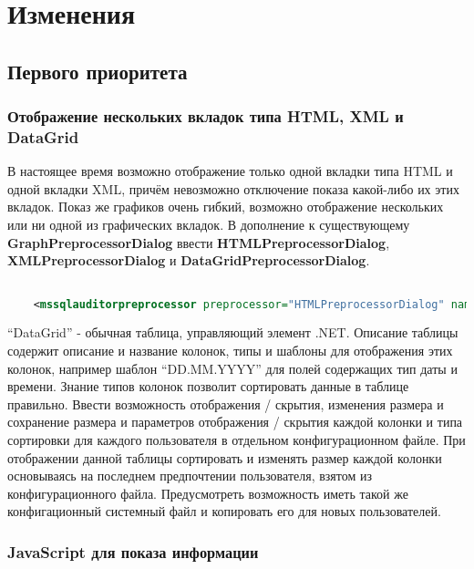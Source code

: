 \section{Изменения}

\subsection{Первого приоритета}

\subsubsection{Отображение нескольких вкладок типа HTML, XML и DataGrid}

В настоящее время возможно отображение только одной вкладки типа HTML и одной вкладки XML, причём
невозможно отключение показа какой-либо их этих вкладок. Показ же графиков очень гибкий, возможно
отображение нескольких или ни одной из графических вкладок. В дополнение к существующему
\textbf{Graph\-Preprocessor\-Dialog} ввести \textbf{HTML\-Preprocessor\-Dialog},
\textbf{XML\-Preprocessor\-Dialog} и \textbf{DataGrid\-Preprocessor\-Dialog}.

\begin{lstlisting}[language=XML,label=MSSQLServerAuditor.xml,caption=MSSQLServerAuditor.xml]

	<mssqlauditorpreprocessor preprocessor="HTMLPreprocessorDialog" name="За сегодня">

\end{lstlisting}

``DataGrid'' - обычная таблица, управляющий элемент .NET. Описание таблицы содержит описание и
название колонок, типы и шаблоны для отображения этих колонок, например шаблон ``DD.MM.YYYY'' для
полей содержащих тип даты и времени. Знание типов колонок позволит сортировать данные в таблице
правильно. Ввести возможность отображения / скрытия, изменения размера и сохранение размера и
параметров отображения / скрытия каждой колонки и типа сортировки для каждого пользователя в
отдельном конфигурационном файле. При отображении данной таблицы сортировать и изменять размер
каждой колонки основываясь на последнем предпочтении пользователя, взятом из конфигурационного
файла. Предусмотреть возможность иметь такой же конфигационный системный файл и копировать его для
новых пользователей.

\subsubsection{JavaScript для показа информации}

